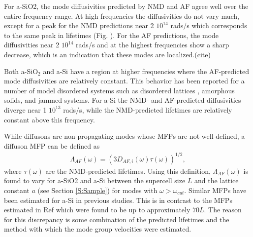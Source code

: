 \documentclass[aps,prb,onecolumn,preprint,superscriptaddress,footinbib,amsmath,amssymb,floatfix]{revtex4}
\begin{document}
For a-SiO2, the mode diffusivities predicted by NMD and AF agree 
well over the entire frequency range. At high frequencies the 
diffusivities do not vary much, except for a 
peak for the NMD predictions near 2 $10^{14}$ rads/s which 
corresponds to the same peak in lifetimes (Fig. ). For 
the AF predictions, the mode diffusivities near 
2 $10^{14}$ rads/s and at the highest frequencies 
show a sharp decrease, which is an indication 
that these modes are localized.(cite) 

Both a-SiO$_2$ and a-Si have a region at higher frequencies where the 
AF-predicted mode diffusivities are relatively constant. This behavior 
has been reported for a number of model disordered systems such as 
disordered lattices
\cite{sheng_heat_1991,beltukov_ioffe-regel_2013,larkin_predicting_2013}, 
amorphous solids,\cite{he_thermal_2011} 
and jammed systems.\cite{xu_energy_2009,vitelli_heat_2010}  
For a-Si the NMD- and AF-predicted diffusivities diverge 
near 1 $10^{13}$ rads$/$s, while the NMD-predicted lifetimes 
are relatively constant above this frequency.  

While diffusons are non-propagating modes whose MFPs are not 
well-defined, a diffuson MFP can be defined as
\begin{equation}\label{EQ:LambdaAF}
\begin{split}
\Lambda_{AF}(\omega) = (3D_{AF,i}(\omega)\tau(\omega))^{1/2},
\end{split}
\end{equation}
where $\tau(\omega)$ are the NMD-predicted lifetimes. Using this 
definition, $\Lambda_{AF}(\omega)$ is found to vary 
for a-SiO2 and a-Si between 
the supercell size $L$ and the lattice constant $a$ 
(see Section \ref{S:Sample}) for modes with $\omega > \omega_{cut}$. 
Similar MFPs have been estimated for a-Si in 
previous studies.\cite{feldman_thermal_1993,feldman_numerical_1999} 
This is in contrast to the MFPs estimated in Ref 
which were found to be up to approximately $70 L$. The reason 
for this discrepancy is some combination of the predicted lifetimes 
and the method with which the mode group velocities were estimated.
\cite{he_heat_2011}
\end{document}
